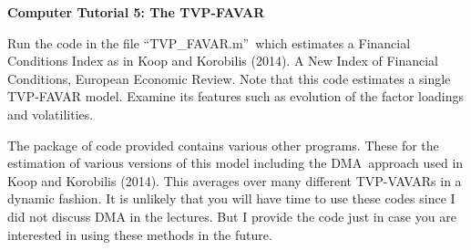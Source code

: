 \documentclass{article}
\begin{document}
\begin{center}
\textbf{Computer Tutorial 5: The TVP-FAVAR}
\end{center}

Run the code in the file \textquotedblleft TVP\_FAVAR.m\textquotedblright\
which estimates a Financial Conditions Index as in Koop and Korobilis
(2014). A New Index of Financial Conditions, European Economic Review. Note
that this code estimates a single TVP-FAVAR model. Examine its features such
as evolution of the factor loadings and volatilities. 

The package of code provided contains various other programs. These for the
estimation of various versions of this model including the DMA\ approach
used in Koop and Korobilis (2014). This averages over many different
TVP-VAVARs in a dynamic fashion. It is unlikely that you will have time to
use these codes since I did not discuss DMA in the lectures. But I provide
the code just in case you are interested in using these methods in the
future.
\end{document}
